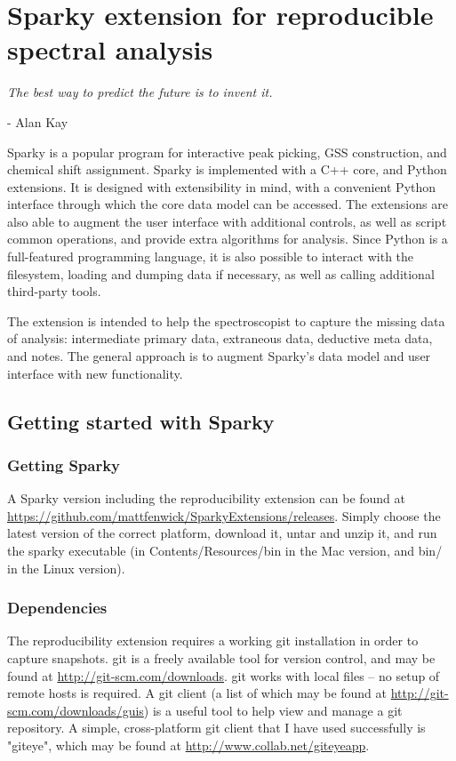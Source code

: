 \chapter{Sparky extension for reproducible spectral analysis}
\label{sec_sparky_extension}

\begin{center}
  \textit{The best way to predict the future is to invent it.}

 - Alan Kay
\end{center}


Sparky \cite{sparky} is a popular program for interactive peak picking,
GSS construction, and chemical shift assignment.  Sparky is implemented 
with a C++ core, and Python extensions.  It is designed with
extensibility in mind, with a convenient Python interface through which 
the core data model can be accessed.  The
extensions are also able to augment the user interface with additional
controls, as well as script common operations, and provide extra algorithms
for analysis.  Since Python is a full-featured programming language, 
it is also possible to interact with the filesystem, loading and dumping
data if necessary, as well as calling additional third-party tools.

The extension is intended to help the spectroscopist to capture the 
missing data of analysis: intermediate primary data, extraneous
data, deductive meta data, and notes.  The general approach is to augment
Sparky's data model and user interface with new functionality.



\section{Getting started with Sparky}

\subsection*{Getting Sparky}
A Sparky version including the reproducibility extension can be found at
\url{https://github.com/mattfenwick/SparkyExtensions/releases}.  Simply 
choose the latest version of the correct platform, download it, untar and 
unzip it, and run the sparky executable (in Contents/Resources/bin in the
Mac version, and bin/ in the Linux version).

\subsection*{Dependencies}
The reproducibility extension requires a working git installation in order
to capture snapshots.  git is a freely available tool for version control,
and may be found at \url{http://git-scm.com/downloads}.
git works with local files -- no setup of remote hosts is required.
A git client (a list of which may be found at \url{http://git-scm.com/downloads/guis})
is a useful tool to help view and manage a git repository.  A simple,
cross-platform git client that I have used successfully is "giteye",
which may be found at \url{http://www.collab.net/giteyeapp}.

